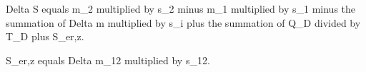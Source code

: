 Delta S equals m_2 multiplied by s_2 minus m_1 multiplied by s_1 minus the summation of Delta m multiplied by s_i plus the summation of Q_D divided by T_D plus S_er,z.  

S_er,z equals Delta m_12 multiplied by s_12.